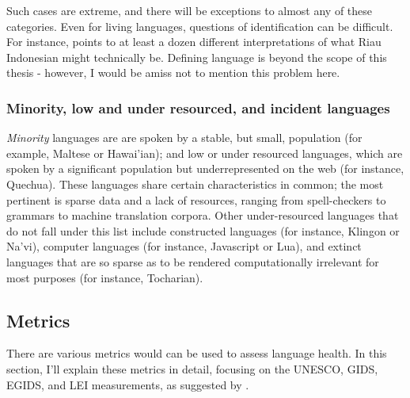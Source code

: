 Such cases are extreme, and there will be exceptions to almost any of these categories. Even for living languages, questions of identification can be difficult. For instance, \cite{gilRiau} points to at least a dozen different interpretations of what Riau Indonesian might technically be. Defining language is beyond the scope of this thesis - however, I would be amiss not to mention this problem here.

\subsubsection{Minority, low and under resourced, and incident languages}

{\it Minority} languages are are spoken by a stable, but small, population (for example, Maltese or Hawai'ian); and low or under resourced languages, which are spoken by a significant population but underrepresented on the web (for instance, Quechua). These languages share certain characteristics in common; the most pertinent is sparse data and a lack of resources, ranging from spell-checkers to grammars to machine translation corpora. Other under-resourced languages that do not fall under this list include constructed languages (for instance, Klingon or Na'vi), computer languages (for instance, Javascript or Lua), and extinct languages that are so sparse as to be rendered computationally irrelevant for most purposes (for instance, Tocharian).

%
%

\subsection{Metrics}

There are various metrics would can be used to assess language health. In this section, I'll explain these metrics in detail, focusing on the UNESCO, GIDS, EGIDS, and LEI measurements, as suggested by \citet{yang2017toward}.

